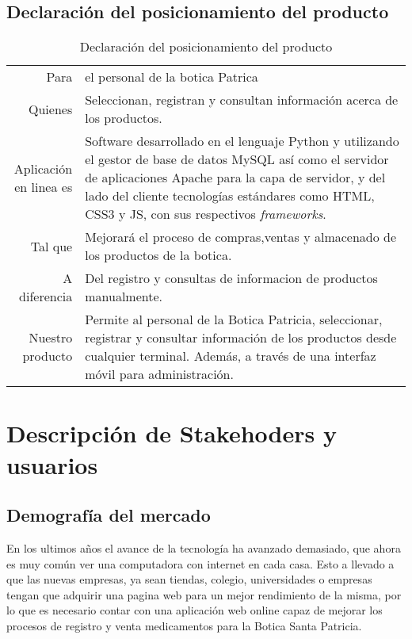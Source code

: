 \documentclass[a4paper,11pt, spanish]{report}
\makeatletter
\newcommand{\celda}[3][t]{%
  \begin{tabular}[#1]{@{}#2@{}}#3\end{tabular}}
\makeatother
\begin{document}
{      \subsection{Declaración del posicionamiento del producto}
      {\renewcommand{\arraystretch}{1.5}%
      \noindent\begin{table}[H]
      \noindent\begin{tabularx}{\textwidth}{r|X}
        Para & el personal de la botica Patrica\\
        Quienes & Seleccionan, registran y consultan información acerca de los productos.\\
        \celda{r}{Aplicación \\ en linea es} & Software desarrollado en el lenguaje Python y utilizando el gestor de base de datos MySQL así como el servidor de aplicaciones Apache para la capa de servidor, y del lado del cliente tecnologías estándares como HTML, CSS3 y JS, con sus respectivos \textit{frameworks}.\\
        Tal que & Mejorará el proceso de compras,ventas y almacenado de los productos de la botica.\\
        A diferencia & Del registro y consultas de informacion de productos manualmente.\\
        \celda{r}{Nuestro \\ producto} & Permite al personal de la Botica Patricia, seleccionar, registrar y consultar información de los productos desde cualquier terminal. Además, a través de una interfaz móvil para administración.\\
      \end{tabularx}
      \caption{Declaración del posicionamiento del producto}
      \end{table}
    \section{Descripción de Stakehoders y usuarios}
      \subsection{Demografía del mercado}
        En los ultimos años el avance de la tecnología ha avanzado demasiado, que ahora es muy común ver una computadora con internet en cada casa.
        Esto a llevado a que las nuevas empresas, ya sean tiendas, colegio, universidades o empresas tengan que adquirir una pagina web para un mejor rendimiento de la misma, por lo que es necesario contar con una aplicación web online capaz de mejorar los procesos de registro y venta medicamentos para la Botica Santa Patricia.
}}
\end{document}
